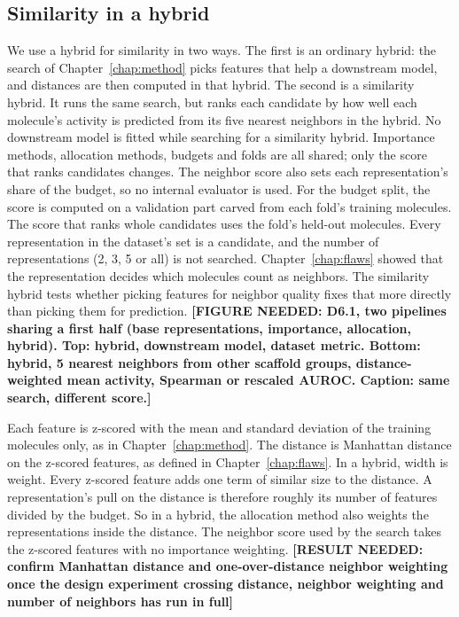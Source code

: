 \subsection{Similarity in a hybrid}

We use a hybrid for similarity in two ways. The first is an ordinary hybrid: the search of Chapter~\ref{chap:method} picks features that help a downstream model, and distances are then computed in that hybrid. The second is a similarity hybrid. It runs the same search, but ranks each candidate by how well each molecule's activity is predicted from its five nearest neighbors in the hybrid. No downstream model is fitted while searching for a similarity hybrid. Importance methods, allocation methods, budgets and folds are all shared; only the score that ranks candidates changes. The neighbor score also sets each representation's share of the budget, so no internal evaluator is used. For the budget split, the score is computed on a validation part carved from each fold's training molecules. The score that ranks whole candidates uses the fold's held-out molecules. Every representation in the dataset's set is a candidate, and the number of representations (2, 3, 5 or all) is not searched. Chapter~\ref{chap:flaws} showed that the representation decides which molecules count as neighbors. The similarity hybrid tests whether picking features for neighbor quality fixes that more directly than picking them for prediction. \textbf{[FIGURE NEEDED: D6.1, two pipelines sharing a first half (base representations, importance, allocation, hybrid). Top: hybrid, downstream model, dataset metric. Bottom: hybrid, 5 nearest neighbors from other scaffold groups, distance-weighted mean activity, Spearman or rescaled AUROC. Caption: same search, different score.]}

Each feature is z-scored with the mean and standard deviation of the training molecules only, as in Chapter~\ref{chap:method}. The distance is Manhattan distance on the z-scored features, as defined in Chapter~\ref{chap:flaws}. In a hybrid, width is weight. Every z-scored feature adds one term of similar size to the distance. A representation's pull on the distance is therefore roughly its number of features divided by the budget. So in a hybrid, the allocation method also weights the representations inside the distance. The neighbor score used by the search takes the z-scored features with no importance weighting. \textbf{[RESULT NEEDED: confirm Manhattan distance and one-over-distance neighbor weighting once the design experiment crossing distance, neighbor weighting and number of neighbors has run in full]}

